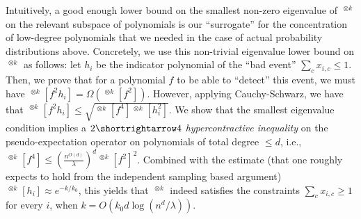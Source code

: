 \documentclass[10pt,a4paper]{article}
\theoremstyle{definition}
\DeclareMathOperator{\pE}{\tilde{\mathbb{E}}}
\newcommand{\numcolors}{k}
\newcommand{\numlb}{k_0}
\begin{document}
Intuitively, a good enough lower bound on the smallest non-zero eigenvalue of $\pE^{\otimes k}$ on the relevant subspace of polynomials is our ``surrogate'' for the concentration of low-degree polynomials that we needed in the case of actual probability distributions above. Concretely, we use this non-trivial eigenvalue lower bound on $\pE^{\otimes k}$ as follows: let $h_i$ be the indicator polynomial of the ``bad event'' $\sum_c x_{i,c} \leq 1$. Then, we prove that for a polynomial $f$ to be able to ``detect'' this event, we must have $\pE^{\otimes \numcolors}[f^2 h_i] = \Omega(\pE^{\otimes \numcolors}[f^2])$. However, applying Cauchy-Schwarz, we have that $\pE^{\otimes \numcolors}[f^2 h_i] \leq \sqrt{\pE^{\otimes \numcolors}[f^4] \pE^{\otimes \numcolors}[h_i^2]}$. We show that the smallest eigenvalue condition implies a \emph{$2 \shortrightarrow 4$ hypercontractive inequality} on the pseudo-expectation operator on polynomials of total degree $\leq d$, i.e., $\pE^{\otimes \numcolors}[f^4]  \leq (\frac{n^{O(d)}}{\lambda})^d \pE^{\otimes \numcolors}[f^2]^2$. Combined with the estimate (that one roughly expects to hold from the independent sampling based argument) $\pE^{\otimes \numcolors}[h_i] \approx e^{-\numcolors/\numlb}$, this yields that $\pE^{\otimes \numcolors}$ indeed satisfies the constraints $\sum_{c} x_{i,c} \geq 1$ for every $i$, when $\numcolors = O(\numlb d \log (n^d/\lambda))$.
\end{document}
